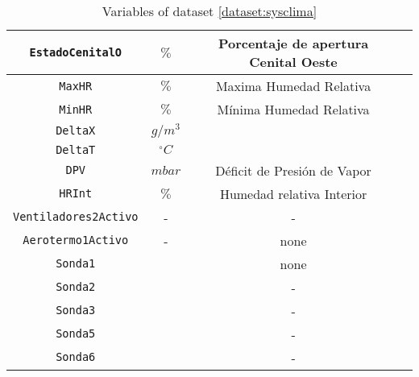 \begin{table}
\begin{tabular}{|c|c|c|c|}
        \texttt{EstadoCenitalO}     & $\%$           & Porcentaje de apertura Cenital Oeste     \\ \hline
        \texttt{MaxHR}              & $\%$           & Maxima Humedad Relativa      \\ \hline
        \texttt{MinHR}              & $\%$           & Mínima Humedad Relativa      \\ \hline
        \texttt{DeltaX}             & $g/m^3$        &                              \\ \hline
        \texttt{DeltaT}             & $^\circ C$     &                              \\ \hline
        \texttt{DPV}                & $mbar$         & Déficit de Presión de Vapor  \\  \hline
        \texttt{HRInt}              & $\%$           & Humedad relativa Interior    \\ \hline
        \texttt{Ventiladores2Activo}&    -            &         -                    \\ \hline
        \texttt{Aerotermo1Activo}   &    -           &         none                    \\ \hline
        \texttt{Sonda1}             &                &        none                    \\ \hline
        \texttt{Sonda2}             &                &         -                    \\ \hline
        \texttt{Sonda3}             &                &         -                    \\ \hline
        \texttt{Sonda5}             &                &         -                    \\ \hline
        \texttt{Sonda6}             &                &         -                    \\
        \hline
    \end{tabular}
    \caption{Variables of dataset \ref{dataset:sysclima}}
    \label{table:SysClimaDS}
\end{table}